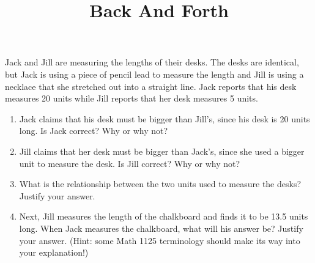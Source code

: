 \documentclass[nooutcomes,noauthor]{ximera}
\title{Back And Forth}
\begin{document}
\begin{abstract}\end{abstract}
\maketitle




\begin{problem}
    Jack and Jill are measuring the lengths of their desks.  The desks are identical, but Jack is using a piece of pencil lead to measure the length and Jill is using a necklace that she stretched out into a straight line.  Jack reports that his desk measures 20 units while Jill reports that her desk measures 5 units.
    \begin{enumerate}
        \item Jack claims that his desk must be bigger than Jill's, since his desk is 20 units long.  Is Jack correct?  Why or why not?
        \item Jill claims that her desk must be bigger than Jack's, since she used a bigger unit to measure the desk.  Is Jill correct?  Why or why not?
        \item What is the relationship between the two units used to measure the desks?  Justify your answer.
        \item Next, Jill measures the length of the chalkboard and finds it to be 13.5 units long.  When Jack measures the chalkboard, what will his answer be?  Justify your answer.  (Hint: some Math 1125 terminology should make its way into your explanation!)
    \end{enumerate}
    

\end{problem} \vfill
\end{document}
